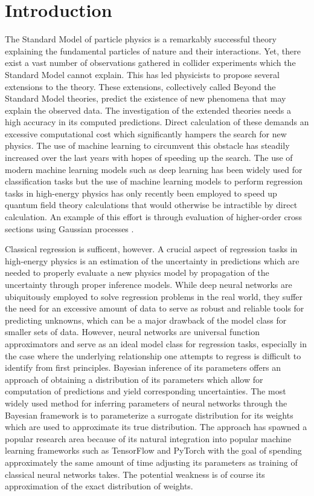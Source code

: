 \chapter*{Introduction}


The Standard Model of particle physics is a remarkably successful theory explaining the fundamental particles of nature and their interactions. Yet, there exist a vast number of observations gathered in collider experiments which the Standard Model cannot explain. 
This has led physicists to propose several extensions to the theory.
These extensions, collectively called Beyond the Standard Model theories, predict the existence of new phenomena that may explain the observed data. The investigation of the extended theories needs a high accuracy in its computed predictions. Direct calculation of these demands an excessive computational cost which significantly hampers the search for new physics. The use of machine learning to 
circumvent this obstacle has steadily increased over the last years with hopes of speeding up the search. The use of modern machine learning models such as deep learning has been widely used for classification tasks but the use of machine learning models to perform regression tasks in high-energy physics has only recently been employed to speed up quantum field theory calculations that would otherwise be intractible by direct calculation. An example of this effort is through evaluation of higher-order cross sections using Gaussian processes \cite{xsec}. 

Classical regression is sufficent, however. A crucial aspect of regression tasks in high-energy physics is an estimation of the uncertainty in predictions which are needed to properly evaluate a new physics model by propagation of the uncertainty through proper inference models. While deep neural networks are ubiquitously employed to solve regression problems in the real world, they suffer the need for an excessive amount of data to serve as robust and reliable tools for predicting unknowns, which can be a major drawback of the model class for smaller sets of data. However, neural networks are universal function approximators and serve as an ideal model class for regression tasks, especially in the case where the underlying relationship one attempts to regress is difficult to identify from first principles. Bayesian inference of its parameters offers an approach of obtaining a distribution of its parameters which allow for computation of predictions and yield corresponding uncertainties. The most widely used method for inferring parameters of neural networks through the Bayesian framework is to parameterize a surrogate distribution for its weights which are used to approximate its true distribution. The approach has spawned a popular research area because of its natural integration into popular machine learning frameworks such as TensorFlow and PyTorch with the goal of spending approximately the same amount of time adjusting its parameters as training of classical neural networks takes. The potential weakness is of course its approximation of the exact distribution of weights. 

